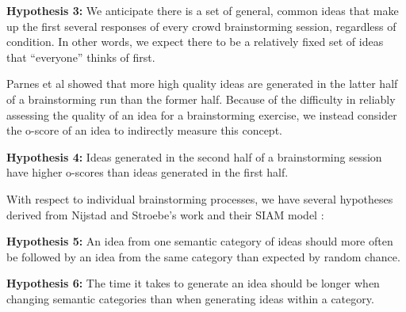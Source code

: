 \textbf{Hypothesis 3:} We anticipate there is a set of general, common ideas that make up the first several responses of every crowd brainstorming session, regardless of condition. In other words, we expect there to be a relatively fixed set of ideas that ``everyone'' thinks of first.

Parnes et al \cite{parnes_effects_1961} showed that more high quality ideas are generated in the latter half of a brainstorming run than the former half. Because of the difficulty in reliably assessing the quality of an idea for a brainstorming exercise, we instead consider the o-score of an idea to indirectly measure this concept.

\textbf{Hypothesis 4:} Ideas generated in the second half of a brainstorming session have higher o-scores than ideas generated in the first half.

With respect to individual brainstorming processes, we have several hypotheses derived from Nijstad and Stroebe's work and their SIAM model \cite{nijstad_how_2006}:

\textbf{Hypothesis 5:} An idea from one semantic category of ideas should more often be followed by an idea from the same category than expected by random chance.

\textbf{Hypothesis 6:} The time it takes to generate an idea should be longer when changing semantic categories than when generating ideas within a category.



